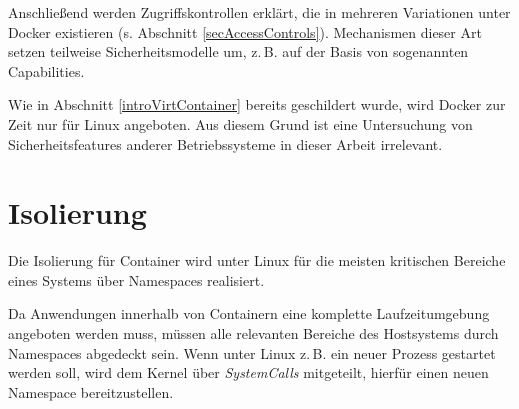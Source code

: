 \documentclass[../main.tex]{subfiles}
\begin{document}
	Anschließend werden Zugriffskontrollen erklärt, die in mehreren Variationen unter Docker existieren (s. Abschnitt \ref{secAccessControls}). Mechanismen dieser Art setzen teilweise Sicherheitsmodelle um, z.\,B. auf der Basis von sogenannten Capabilities.




	Wie in Abschnitt \ref{introVirtContainer} bereits geschildert wurde, wird Docker zur Zeit nur für Linux angeboten. Aus diesem Grund ist eine Untersuchung von Sicherheitsfeatures anderer Betriebssysteme in dieser Arbeit irrelevant.




	\section{Isolierung}
  \label{secIsolierung}
		Die Isolierung für Container wird unter Linux für die meisten kritischen Bereiche eines Systems über Namespaces realisiert.

		Da Anwendungen innerhalb von Containern eine komplette Laufzeitumgebung angeboten werden muss, müssen alle relevanten Bereiche des Hostsystems durch Namespaces abgedeckt sein.	Wenn unter Linux z.\,B. ein neuer Prozess gestartet werden soll, wird dem Kernel über \emph{\glspl{SystemCall}} mitgeteilt, hierfür einen neuen Namespace bereitzustellen.
\end{document}

